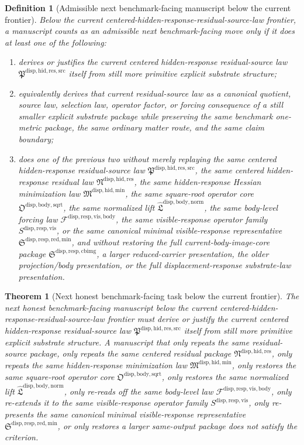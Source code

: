 \documentclass[11pt]{article}
\newcommand{\ResidualSourceLawPackage}{\mathfrak P^{\mathrm{disp,hid,res,src}}}
\newcommand{\ResidualLawPackage}{\mathfrak N^{\mathrm{disp,hid,res}}}
\newcommand{\HiddenMinimizationPackage}{\mathfrak M^{\mathrm{disp,hid,min}}}
\newcommand{\SquareRootOperatorCore}{\mathfrak O^{\mathrm{disp,body,sqrt}}}
\newcommand{\NormalizedLiftPackage}{\widehat{\mathfrak L}^{\mathrm{disp,body,norm}}}
\newcommand{\VisibleBodyForcingLaw}{\mathscr F^{\mathrm{disp,resp,vis,body}}}
\newcommand{\VisibleResponseOperator}{S^{\mathrm{disp,resp,vis}}}
\newcommand{\MinimalReducedStructure}{\mathfrak S^{\mathrm{disp,resp,red,min}}}
\newcommand{\CurrentBodyImageCore}{\mathfrak S^{\mathrm{disp,resp,cbimg}}}
\newtheorem{definition}{Definition}
\newtheorem{theorem}{Theorem}
\begin{document}
\begin{definition}[Admissible next benchmark-facing manuscript below the current frontier]
Below the current centered-hidden-response-residual-source-law frontier, a manuscript counts as an admissible next benchmark-facing move only if it does at least one of the following:
\begin{enumerate}
    \item derives or justifies the current centered hidden-response residual-source law \(\ResidualSourceLawPackage\) itself from still more primitive explicit substrate structure;
    \item equivalently derives that current residual-source law as a canonical quotient, source law, selection law, operator factor, or forcing consequence of a still smaller explicit substrate package while preserving the same benchmark one-metric package, the same ordinary matter route, and the same claim boundary;
    \item does one of the previous two without merely replaying the same centered hidden-response residual-source law \(\ResidualSourceLawPackage\), the same centered hidden-response residual law \(\ResidualLawPackage\), the same hidden-response Hessian minimization law \(\HiddenMinimizationPackage\), the same square-root operator core \(\SquareRootOperatorCore\), the same normalized lift \(\NormalizedLiftPackage\), the same body-level forcing law \(\VisibleBodyForcingLaw\), the same visible-response operator family \(\VisibleResponseOperator\), or the same canonical minimal visible-response representative \(\MinimalReducedStructure\), and without restoring the full current-body-image-core package \(\CurrentBodyImageCore\), a larger reduced-carrier presentation, the older projection/body presentation, or the full displacement-response substrate-law presentation.
\end{enumerate}
\end{definition}

\begin{theorem}[Next honest benchmark-facing task below the current frontier]
The next honest benchmark-facing manuscript below the current centered-hidden-response-residual-source-law frontier must derive or justify the current centered hidden-response residual-source law \(\ResidualSourceLawPackage\) itself from still more primitive explicit substrate structure. A manuscript that only repeats the same residual-source package, only repeats the same centered residual package \(\ResidualLawPackage\), only repeats the same hidden-response minimization law \(\HiddenMinimizationPackage\), only restores the same square-root operator core \(\SquareRootOperatorCore\), only restores the same normalized lift \(\NormalizedLiftPackage\), only re-reads off the same body-level law \(\VisibleBodyForcingLaw\), only re-extends it to the same visible-response operator family \(\VisibleResponseOperator\), only re-presents the same canonical minimal visible-response representative \(\MinimalReducedStructure\), or only restores a larger same-output package does not satisfy the criterion.
\end{theorem}
\end{document}
